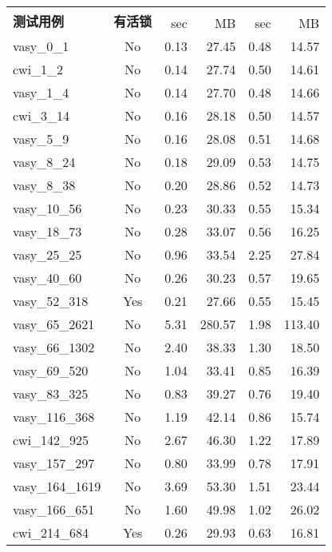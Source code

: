 \begin{figure}[h!]
	\centering
	\scriptsize
	\setlength{\tabcolsep}{8pt}
	\begin{tabular}{| l | c | r | r | r | r |}
		\hline
		\multirow{2}{1.3cm}{\textbf{测试用例}} & \multirow{2}{1cm}{\textbf{有活锁}} & \multicolumn{2}{c|}{\sctlprov{}} & \multicolumn{2}{c|}{\CADP{}}\\
		\cline{3-6}
		{}&{} & sec & MB & sec & MB\\
		\hline
		
		vasy\_0\_1 & No &0.13 &	27.45 &	0.48 &	14.57 \\\hline
		cwi\_1\_2 & No &0.14 &	27.74 &	0.50 &	14.61 \\\hline
		vasy\_1\_4 	& No &0.14& 	27.70& 	0.48 &	14.66 \\\hline
		cwi\_3\_14 	& No &0.16 &	28.18 &	0.50 &	14.57 \\\hline
		vasy\_5\_9 	& No &0.16 	&28.08 &	0.51 &	14.68 \\\hline
		vasy\_8\_24 & No &0.18 	&29.09 &	0.53 &	14.75 \\\hline
		vasy\_8\_38 & No &0.20 	&28.86 	&0.52 &	14.73 \\\hline
		vasy\_10\_56 &	No &0.23 &	30.33 &	0.55 &	15.34 \\\hline
		vasy\_18\_73 &	No &0.28 &	33.07 &	0.56 &	16.25 \\\hline
		vasy\_25\_25 &	No &0.96 &	33.54 &	2.25 &	27.84 \\\hline
		vasy\_40\_60 &	No &0.26 &	30.23 &	0.57 &	19.65 \\\hline
		vasy\_52\_318 &	Yes &0.21 &	27.66 &	0.55 &	15.45 \\\hline
		vasy\_65\_2621 & No &5.31 &	280.57 &	1.98 &	113.40 \\\hline
		vasy\_66\_1302 & No &2.40 &	38.33 &	1.30 &	18.50 \\\hline
		vasy\_69\_520 &	No &1.04 &	33.41 &	0.85 &	16.39 \\\hline
		vasy\_83\_325 &	No &0.83 &	39.27 &	0.76 &	19.40 \\\hline
		vasy\_116\_368 & No &1.19 &	42.14 &	0.86 &	15.74 \\\hline
		cwi\_142\_925 & No &2.67 &	46.30 &	1.22 &	17.89 \\\hline
		vasy\_157\_297 & No &0.80 &	33.99 &	0.78 &	17.91 \\\hline
		vasy\_164\_1619 & No &3.69 &	53.30 &	1.51& 	23.44 \\\hline
		vasy\_166\_651 & No &1.60 	&49.98 &	1.02 &	26.02 \\\hline
		cwi\_214\_684 &	Yes &0.26 	&29.93 &	0.63 &	16.81 \\\hline

\end{tabular}
\end{figure}
